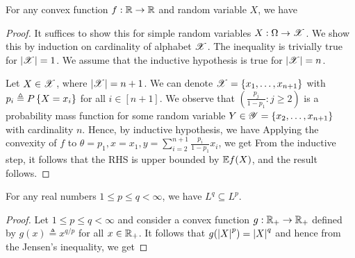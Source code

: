 \documentclass[letterpaper,10pt,english]{article}
\begin{document}
\begin{thm} 
For any convex function $f: \mathbb{R} \to \mathbb{R}$ and random variable $X$, we have 
\end{thm}
\begin{proof}
It suffices to show this for simple random variables $X: \Omega \to \mathscr{X}$. 
We show this by induction on cardinality of alphabet $\mathscr{X}$.  
The inequality is trivially true for $\left\lvert\mathscr{X}\right\rvert=1$. 
We assume that the inductive hypothesis is true for $\left\lvert\mathscr{X}\right\rvert = n$. 

Let $X \in \mathscr{X}$, where $\left\lvert\mathscr{X}\right\rvert = n+1$. 
We can denote $\mathscr{X} = \left\{x_1, \dots, x_{n+1}\right\}$ with $p_i \triangleq P\left\{X = x_i\right\}$ for all $i \in [n+1]$. 
We observe that $(\frac{p_j}{1-p_1}: j \ge 2)$ is a probability mass function for some random variable $Y \in \mathscr{Y} = \left\{x_2, \dots, x_{n+1}\right\}$ with cardinality $n$. 
Hence, by inductive hypothesis, we have 
Applying the convexity of $f$ to $\theta = p_1, x = x_1, y = \sum_{i=2}^{n+1}\frac{p_i}{1-p_1}x_i$, we get 
From the inductive step, it follows that the RHS is upper bounded by $\mathbb{E} f(X)$, and the result follows.
\end{proof}
\begin{thm} For any real numbers $1 \le p \le q < \infty$, we have $L^q \subseteq L^p$.
\end{thm}
\begin{proof}
Let $1 \le p \le q < \infty$ and consider a convex function $g: \mathbb{R}_+ \to \mathbb{R}_+$ defined by $g(x) \triangleq x^{{q}/{p}}$ for all $x \in \mathbb{R}_+$. 
It follows that $g(\left\lvert X\right\rvert^p) = \left\lvert X\right\rvert^q$ and hence from the Jensen's inequality, we get
\end{proof}
\end{document}
